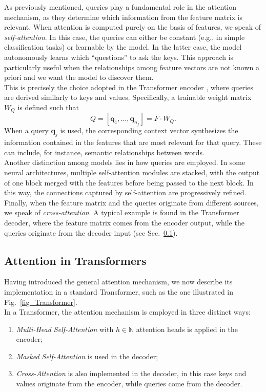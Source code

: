 As previously mentioned, queries play a fundamental role in the attention mechanism, as they determine which information from the feature matrix is relevant.  
When attention is computed purely on the basis of features, we speak of \textit{self-attention}. In this case, the queries can either be constant (e.g., in simple classification tasks) or learnable by the model. In the latter case, the model autonomously learns which “questions” to ask the keys. This approach is particularly useful when the relationships among feature vectors are not known a priori and we want the model to discover them.\\
This is precisely the choice adopted in the Transformer encoder \cite{Att_is_all_u_need}, where queries are derived similarly to keys and values. Specifically, a trainable weight matrix $W_Q$ is defined such that
\begin{equation}
    Q = [ \mathbf{q}_1, \dots, \mathbf{q}_{n_{f}} ] = F \cdot W_Q.
\end{equation}
When a query $\mathbf{q}_j$ is used, the corresponding context vector synthesizes the information contained in the features that are most relevant for that query. These can include, for instance, semantic relationships between words.\\
Another distinction among models lies in how queries are employed. In some neural architectures, multiple self-attention modules are stacked, with the output of one block merged with the features before being passed to the next block. In this way, the connections captured by self-attention are progressively refined.\\
Finally, when the feature matrix and the queries originate from different sources, we speak of \textit{cross-attention}.  
A typical example is found in the Transformer decoder, where the feature matrix comes from the encoder output, while the queries originate from the decoder input (see Sec.~\ref{Attention in Transformer}).

\subsection{Attention in Transformers}\label{Attention in Transformer}
Having introduced the general attention mechanism, we now describe its implementation in a standard Transformer, such as the one illustrated in Fig.~\ref{fig_Transformer}.\\
In a Transformer, the attention mechanism is employed in three distinct ways:
\begin{enumerate}
    \item \textit{Multi-Head Self-Attention} with $h \in \mathbb{N}$ attention heads is applied in the encoder;
    \item \textit{Masked Self-Attention} is used in the decoder; 
    \item \textit{Cross-Attention} is also implemented in the decoder, in this case keys and values originate from the encoder, while queries come from the decoder.
\end{enumerate}

